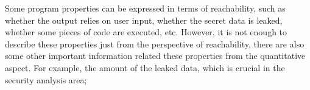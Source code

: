  
Some program properties can be expressed in terms of reachability,
such as
whether the output relies on user input, whether the secret data is leaked, 
whether some pieces of code are executed, etc.
However, it is not enough to describe these properties just
from the perspective of reachability,
there are also some other important information related these properties from the quantitative aspect.
For example, the amount of the leaked data, which is crucial in the security analysis area;

